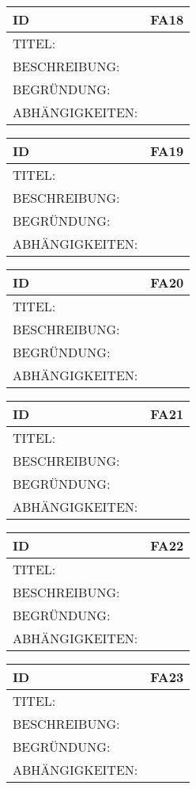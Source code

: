 \documentclass{uulm-assignment}
\begin{document}
\begin{tabularx}{16cm}{l|X}
\textbf{ID} & \textbf{FA18} \\
\hline
TITEL: & \\
\hline
BESCHREIBUNG: & 
\\
\hline
BEGRÜNDUNG: & \\
\hline
ABHÄNGIGKEITEN: & \\
\end{tabularx}

\begin{tabularx}{16cm}{l|X}
\textbf{ID} & \textbf{FA19} \\
\hline
TITEL: & \\
\hline
BESCHREIBUNG: & 
\\
\hline
BEGRÜNDUNG: & \\
\hline
ABHÄNGIGKEITEN: & \\
\end{tabularx}

\begin{tabularx}{16cm}{l|X}
\textbf{ID} & \textbf{FA20} \\
\hline
TITEL: & \\
\hline
BESCHREIBUNG: & 
\\
\hline
BEGRÜNDUNG: & \\
\hline
ABHÄNGIGKEITEN: & \\
\end{tabularx}

\begin{tabularx}{16cm}{l|X}
\textbf{ID} & \textbf{FA21} \\
\hline
TITEL: & \\
\hline
BESCHREIBUNG: & 
\\
\hline
BEGRÜNDUNG: & \\
\hline
ABHÄNGIGKEITEN: & \\
\end{tabularx}

\begin{tabularx}{16cm}{l|X}
\textbf{ID} & \textbf{FA22} \\
\hline
TITEL: & \\
\hline
BESCHREIBUNG: & 
\\
\hline
BEGRÜNDUNG: & \\
\hline
ABHÄNGIGKEITEN: & \\
\end{tabularx}

\begin{tabularx}{16cm}{l|X}
\textbf{ID} & \textbf{FA23} \\
\hline
TITEL: & \\
\hline
BESCHREIBUNG: & 
\\
\hline
BEGRÜNDUNG: & \\
\hline
ABHÄNGIGKEITEN: & \\
\end{tabularx}
\end{document}
